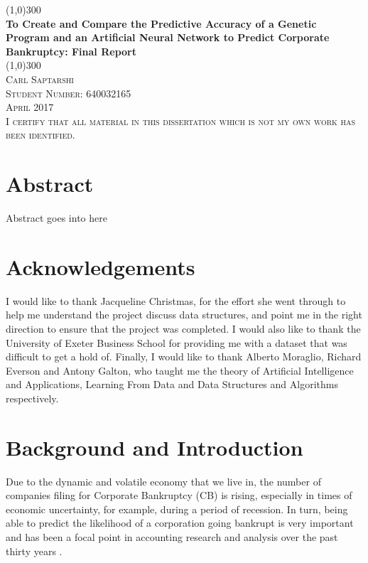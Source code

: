 \documentclass[11pt]{article}
\begin{document}
	\begin{titlepage}
		\begin{center}
			\line(1,0){300}\\
			[0.25in]
			\huge{\bfseries To Create and Compare the Predictive Accuracy of a Genetic Program and an Artificial Neural Network to Predict Corporate Bankruptcy: Final Report}\\
			\line(1,0){300}\\
			[0.25in]
			 \textsc{Carl Saptarshi}\\
			 \textsc{\large  Student Number: 640032165 \\
			 April 2017}\\
			 [10cm]
			 \textsc{\large  I certify that all material in this dissertation which is not my own work has been identified.} \\
		\end{center}
\end{titlepage}
\section*{Abstract}

Abstract goes into here
\cleardoublepage
\section*{Acknowledgements}
I would like to thank Jacqueline Christmas, for the effort she went through to help me understand the project discuss data structures, and point me in the right direction to ensure that the project was completed. I would also like to thank the University of Exeter Business School for providing me with a dataset that was difficult to get a hold of. Finally, I would like to thank Alberto Moraglio, Richard Everson and Antony Galton, who taught me the theory of Artificial Intelligence and Applications, Learning From Data and Data Structures and Algorithms respectively. 
\cleardoublepage
\tableofcontents
\cleardoublepage
{}
\setcounter{page}{1}
\section{Background and Introduction }\label{sec:intro}%
Due to the dynamic and volatile economy that we live in, the number of companies filing for Corporate Bankruptcy (CB) is rising, especially in times of economic uncertainty, for example, during a period of recession. In turn, being able to predict the likelihood of a corporation going bankrupt is very important and has been a focal point in accounting research and analysis over the past thirty years \citep{ref-two,ref-one}.
\end{document}
